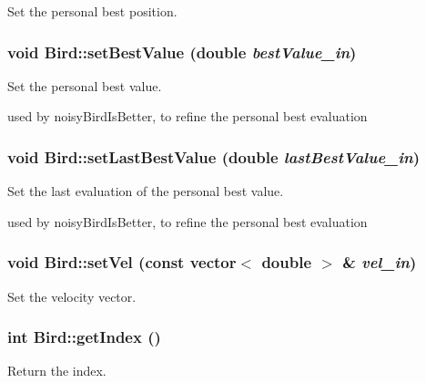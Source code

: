 Set the personal best position. 

\hypertarget{classBird_b0eeeade7db24cf936f9815f2082e7a9}{
\subsubsection{\setlength{\rightskip}{0pt plus 5cm}void Bird::setBestValue (double {\em bestValue\_\-in})}}
\label{classBird_b0eeeade7db24cf936f9815f2082e7a9}


Set the personal best value. 

used by noisyBirdIsBetter, to refine the personal best evaluation \hypertarget{classBird_e3f3b24b964132d871dc68c6c6e81a07}{
\subsubsection{\setlength{\rightskip}{0pt plus 5cm}void Bird::setLastBestValue (double {\em lastBestValue\_\-in})}}
\label{classBird_e3f3b24b964132d871dc68c6c6e81a07}


Set the last evaluation of the personal best value. 

used by noisyBirdIsBetter, to refine the personal best evaluation \hypertarget{classBird_164ec9a9b0fde87bf54ed9390a9729c9}{
\subsubsection{\setlength{\rightskip}{0pt plus 5cm}void Bird::setVel (const vector$<$ double $>$ \& {\em vel\_\-in})}}
\label{classBird_164ec9a9b0fde87bf54ed9390a9729c9}


Set the velocity vector. 

\hypertarget{classBird_4da69cbb9543c97cde515d3ec54a1c4d}{
\subsubsection{\setlength{\rightskip}{0pt plus 5cm}int Bird::getIndex ()}}
\label{classBird_4da69cbb9543c97cde515d3ec54a1c4d}


Return the index. 

